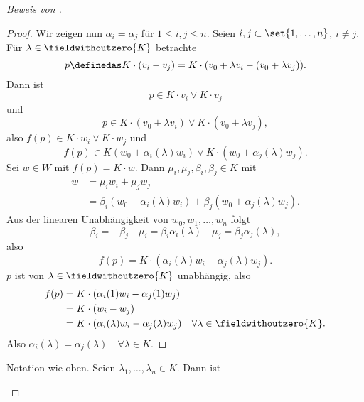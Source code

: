 \begin{proof}[Beweis von ]
\begin{proof}
    Wir zeigen nun \( \alpha_i=\alpha_j \) für \( 1\leq i,j\leq n \). Seien \( i,j\subset \set{1,\dotsc,n} \), \( i\neq j \). Für \( \lambda\in \fieldwithoutzero{K} \) betrachte
    \begin{equation*}
      p\definedas K\cdot(v_i-v_j)=K\cdot (v_0+\lambda v_i-(v_0+\lambda v_j)).
    \end{equation*}
    Dann ist
    \begin{equation*}
      p\in K\cdot v_i\vee K\cdot v_j
    \end{equation*}
    und
    \begin{equation*}
      p\in K\cdot (v_0 +\lambda v_i)\vee K\cdot (v_0+\lambda v_j),
    \end{equation*}
    also \( f(p)\in K\cdot w_i\vee K\cdot w_j \) und
    \begin{equation*}
      f(p)\in K(w_0+\alpha_i(\lambda)w_i)\vee K\cdot (w_0+\alpha_j(\lambda)w_j).
    \end{equation*}
    Sei \( w\in W \) mit \( f(p)=K\cdot w \). Dann \texists \( \mu_i, \mu_j, \beta_i, \beta_j\in K \) mit
    \begin{align*}
      w&=\mu_i w_i+\mu_j w_j\\
      &=\beta_i (w_0+\alpha_i(\lambda)w_i)+\beta_j (w_0+\alpha_j(\lambda)w_j).
    \end{align*}
    Aus der linearen Unabhängigkeit von \( w_0,w_1,\dotsc,w_n \) folgt
    \begin{equation*}
      \beta_i=-\beta_j\quad \mu_i=\beta_i \alpha_i(\lambda)\quad \mu_j=\beta_j \alpha_j(\lambda),
    \end{equation*}
    also
    \begin{equation*}
      f(p)=K\cdot (\alpha_i(\lambda)w_i-\alpha_j(\lambda)w_j).
    \end{equation*}
    \( p \) ist von \( \lambda\in \fieldwithoutzero{K} \) unabhängig, also
    \begin{align*}
      f(p)&=K\cdot (\alpha_i(1)w_i-\alpha_j(1)w_j)\\
      &=K\cdot(w_i-w_j)\\
      &=K\cdot(\alpha_i(\lambda)w_i-\alpha_j(\lambda)w_j)\quad \forall \lambda\in \fieldwithoutzero{K}.
    \end{align*}
    Also \( \alpha_i(\lambda)=\alpha_j(\lambda) \quad \forall \lambda\in K\).
  \end{proof}
  \begin{lemma}\label{kollineation_vielleicht_automorphismus_verhaelt_sich_gut_mit_komischer_art_basis}
    Notation wie oben. Seien \( \lambda_1,\dotsc,\lambda_n\in K \). Dann ist

\end{lemma}
\end{proof}
